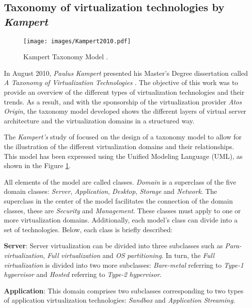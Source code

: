 	\subsection{Taxonomy of virtualization technologies by \textit{Kampert}}
	
	\begin{figure}[H]
		\centering
		\texttt{[image: images/Kampert2010.pdf]}
		\vspace{0.2mm}
		\caption{Kampert Taxonomy Model \cite{Kampert2010}.}
		\label{fig:KampertTaxonomyModel2010}
	\end{figure}
	
	In August 2010, \textit {Paulus Kampert} presented his Master's Degree dissertation called \textit{A Taxonomy of Virtualization Technologies} \cite{Kampert2010}. The objective of this work was to provide an overview of the different types of virtualization technologies and their trends. As a result, and with the sponsorship of the virtualization provider \textit{Atos Origin}, the taxonomy model developed shows the different layers of virtual server architecture and the virtualization domains in a structured way.
	
	The \textit{Kampert's} study of focused on the design of a taxonomy model to allow for the illustration of the different virtualization domains and their relationships. This model has been expressed using the Unified Modeling Language (UML), as shown in the Figure \ref{fig:KampertTaxonomyModel2010}.
	
	All elements of the model are called classes. \textit{Domain} is a superclass of the five domain classes: \textit{Server}, \textit{Application}, \textit{Desktop}, \textit {Storage} and \textit {Network}. The superclass in the center of the model facilitates the connection of the domain classes,
	these are \textit{Security} and \textit {Management}. These classes must apply to one or more virtualization domains. Additionally, each model's class can divide into a set of technologies. Below, each class is briefly described:

	\textbf{Server}:  Server virtualization can be divided into three subclasses such as \textit{Para-virtualization}, \textit{Full virtualization} and \textit{OS partitioning}. In turn, the \textit{Full virtualization} is divided into two more subclasses: \textit{Bare-metal} referring to \textit {Type-1 hypervisor} and \textit{Hosted} referring to \textit {Type-2 hypervisor}.
		
	\textbf {Application}: This domain comprises two subclasses corresponding to two types of application virtualization technologies: \textit{Sandbox} and \textit{Application Streaming}.
		
